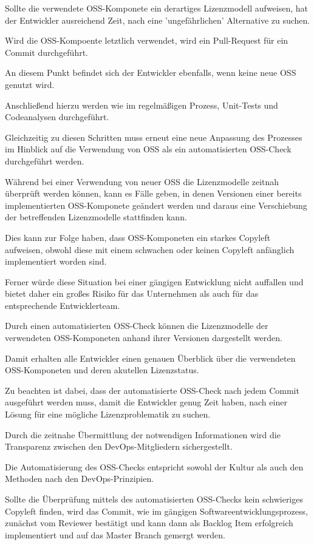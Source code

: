 Sollte die verwendete OSS-Komponete ein derartiges Lizenzmodell aufweisen, hat der Entwickler ausreichend Zeit, nach eine 'ungefährlichen' Alternative zu suchen.  

Wird die OSS-Kompoente letztlich verwendet, wird ein Pull-Request für ein Commit durchgeführt. 

An diesem Punkt befindet sich der Entwickler ebenfalls, wenn keine neue OSS genutzt wird. 

Anschließend hierzu werden wie im regelmäßigen Prozess, Unit-Tests und Codeanalysen durchgeführt.

Gleichzeitig zu diesen Schritten muss erneut eine neue Anpassung des Prozesses im Hinblick auf die Verwendung von OSS als ein automatisierten OSS-Check durchgeführt werden.

Während bei einer Verwendung von neuer OSS die Lizenzmodelle zeitnah überprüft werden können, kann es Fälle geben, in denen Versionen einer bereits implementierten OSS-Komponete geändert werden und daraus eine Verschiebung der betreffenden Lizenzmodelle stattfinden kann. 

Dies kann zur Folge haben, dass OSS-Komponeten ein starkes Copyleft aufweisen, obwohl diese mit einem schwachen oder keinen Copyleft anfänglich implementiert worden sind. 

Ferner würde diese Situation bei einer gängigen Entwicklung nicht auffallen und bietet daher ein großes Risiko für das Unternehmen als auch für das entsprechende Entwicklerteam. 

Durch einen automatisierten OSS-Check können die Lizenzmodelle der verwendeten OSS-Komponeten anhand ihrer Versionen dargestellt werden. 

Damit erhalten alle Entwickler einen genauen Überblick über die verwendeten OSS-Komponeten und deren akutellen Lizenzstatus. 

Zu beachten ist dabei, dass der automatisierte OSS-Check nach jedem Commit ausgeführt werden muss, damit die Entwickler genug Zeit haben, nach einer Lösung für eine mögliche Lizenzproblematik zu suchen.

Durch die zeitnahe Übermittlung der notwendigen Informationen wird die Transparenz zwischen den DevOps-Mitgliedern sichergestellt. 

Die Automatisierung des OSS-Checks entspricht sowohl der Kultur als auch den Methoden nach den DevOps-Prinzipien.

Sollte die Überprüfung mittels des automatisierten OSS-Checks kein schwieriges Copyleft finden, wird das Commit, wie im gängigen Softwareentwicklungsprozess, zunächst vom Reviewer bestätigt und kann dann als Backlog Item erfolgreich implementiert und auf das Master Branch gemergt werden. 

